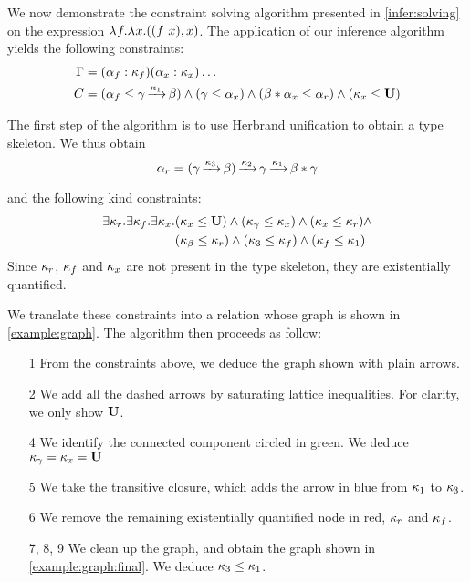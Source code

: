 We now demonstrate the constraint solving
algorithm presented in \cref{infer:solving}
on the expression $\lambda^{{}} f.{\lambda^{{}} x.{((f\ x),x)}}$.
The application of our inference algorithm yields the following constraints:
%
\begin{align*}
  \Gamma &= (\alpha_f : \kappa_f)
  (\alpha_x : \kappa_x)\dots\\
  C &= (\alpha_f \leq \gamma \operatorname{\xrightarrow{\kappa_1}} \beta )
  \wedge
  (\gamma \leq \alpha_x)
  \wedge
  (\beta * \alpha_x \leq \alpha_r)
  \wedge
  (\kappa_x \leq \mathbf{U})
\end{align*}

The first step of the algorithm is to use Herbrand unification to obtain
a type skeleton. We thus obtain
$$\alpha_r =
(\gamma \operatorname{\xrightarrow{\kappa_3}} \beta) \operatorname{\xrightarrow{\kappa_2}} \gamma \operatorname{\xrightarrow{\kappa_1}} \beta * \gamma$$

and the following kind constraints: 
\[\begin{aligned}
  \exists \kappa_r.\exists \kappa_f.\exists \kappa_x.&
  (\kappa_x \leq \mathbf{U})
  \wedge
  (\kappa_\gamma \leq \kappa_x)
  \wedge
  (\kappa_x \leq \kappa_r)
  \wedge\\
  &(\kappa_\beta \leq \kappa_r)
  \wedge
  (\kappa_3 \leq \kappa_f)
  \wedge
  (\kappa_f \leq \kappa_1)
\end{aligned}\]
Since $\kappa_r$, $\kappa_f$ and $\kappa_x$ are not present in the type skeleton,
they are existentially quantified.

We translate these constraints into a relation whose graph
is shown in \cref{example:graph}.
%
The algorithm then proceeds as follow:
\begin{itemize}[noitemsep]
\item[1] From the constraints above, we deduce the graph shown
  with plain arrows.
\item[2] We add all the dashed arrows by saturating
  lattice inequalities. For clarity, we only show $\mathbf{U}$.
\item[4] We identify the connected component circled in
  {\color{green} green}.
  We deduce $\kappa_\gamma = \kappa_x = \mathbf{U}$
\item[5] We take the transitive closure, which adds the
  arrow in {\color{blue} blue} from $\kappa_1$ to $\kappa_3$.
\item[6] We remove the remaining existentially quantified node in {\color{red} red}, $\kappa_r$ and $\kappa_f$.
\item[7, 8, 9] We clean up the graph, and obtain the graph shown
  in \cref{example:graph:final}.
  We deduce $\kappa_3 \leq \kappa_1$.
\end{itemize}

